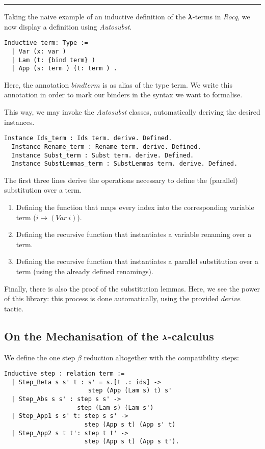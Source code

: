 \vspace{2em} \hrule \vspace{2em}

Taking the naive example of an inductive definition of the $\pmb{\lambda}$-terms in \textit{Rocq}, we now display a definition using \textit{Autosubst}.

\begin{lstlisting}[language=Coq]
  Inductive term: Type :=
  | Var (x: var )
  | Lam (t: {bind term} )
  | App (s: term ) (t: term ) .
\end{lstlisting}

Here, the annotation ${bind term}$ is as alias of the type term.
We write this annotation in order to mark our binders in the syntax we want to formalise.  

This way, we may invoke the \textit{Autosubst} classes, automatically deriving the desired instances.

\begin{lstlisting}[language=Coq]
  Instance Ids_term : Ids term. derive. Defined.
  Instance Rename_term : Rename term. derive. Defined.
  Instance Subst_term : Subst term. derive. Defined.
  Instance SubstLemmas_term : SubstLemmas term. derive. Defined.
\end{lstlisting}

The first three lines derive the operations necessary to define the (parallel) substitution over a term.
\begin{enumerate}
\item Defining the function that maps every index into the corresponding variable term ($i \mapsto (Var \ i)$).
\item Defining the recursive function that instantiates a variable renaming over a term.
\item Defining the recursive function that instantiates a parallel substitution over a term (using the already defined renamings).
\end{enumerate}

Finally, there is also the proof of the substitution lemmas. 
Here, we see the power of this library: this process is done automatically, using the provided $derive$ tactic.

\subsection{On the Mechanisation of the $\pmb{\lambda}$-calculus}

We define the one step $\beta$ reduction altogether with the compatibility steps:
\begin{lstlisting}[language=Coq]
  Inductive step : relation term :=
  | Step_Beta s s' t : s' = s.[t .: ids] ->
                       step (App (Lam s) t) s'
  | Step_Abs s s' : step s s' ->
                    step (Lam s) (Lam s')
  | Step_App1 s s' t: step s s' ->
                      step (App s t) (App s' t)
  | Step_App2 s t t': step t t' ->
                      step (App s t) (App s t').
\end{lstlisting}

